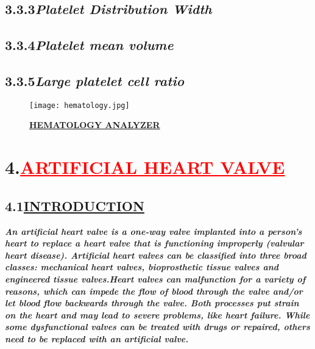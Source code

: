 \documentclass[12pt]{article}
\begin{document}
\subsection*{\hspace{2cm}\textbf{3.3.3\hspace{1cm}\emph{\large{Platelet Distribution Width}}}}
\subsection*{\hspace{2cm}\textbf{3.3.4\hspace{1cm}\emph{\large{Platelet mean volume}}}}
\subsection*{\hspace{2cm}\textbf{3.3.5\hspace{1cm}\emph{\large{Large platelet cell ratio}}}}
\begin{figure}
    \centering
    \texttt{[image: hematology.jpg]}
    \caption{\textbf{\underline{HEMATOLOGY ANALYZER}}}
    \label{fig:3}
\end{figure}
\newpage
\section*{\textbf{4.\hspace{1cm}\textcolor{red}{\underline{\huge{ARTIFICIAL HEART VALVE}}}}}
\vspace{1cm}
\subsection*{\hspace{1cm}\textbf{4.1\hspace{1cm}\underline{\LARGE{INTRODUCTION}}}}
\hspace{1cm}\large{\emph{\textbf{An artificial heart valve is a one-way valve implanted into a person's heart to replace a heart valve that is functioning improperly (valvular heart disease). Artificial heart valves can be classified into three broad classes: mechanical heart valves, bioprosthetic tissue valves and engineered tissue valves.Heart valves can malfunction for a variety of reasons, which can impede the flow of blood through the valve and/or let blood flow backwards through the valve. Both processes put strain on the heart and may lead to severe problems, like heart failure. While some dysfunctional valves can be treated with drugs or repaired, others need to be replaced with an artificial valve.}}}
\vspace{1cm}
\end{document}
